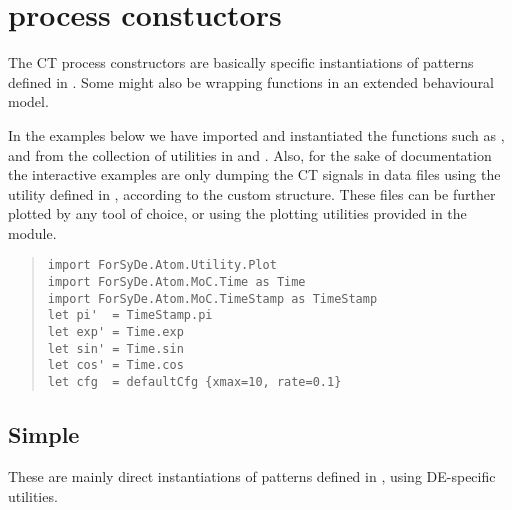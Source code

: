 \section{ process constuctors}
The CT process constructors are basically specific
 instantiations of patterns defined in . Some
 might also be wrapping functions in an extended behavioural
 model.\par
In the examples below we have imported and instantiated the
 functions such as  ,  and  from the
 collection of utilities in  and
 . Also, for the sake of documentation
 the interactive examples are only dumping the CT signals in data
 files using the  utility defined in
 , according to the custom 
 structure. These files can be further plotted by any tool of
 choice, or using the plotting utilities provided in the
  module.\par
\begin{quote}
{\haddockverb\begin{verbatim}
import ForSyDe.Atom.Utility.Plot
import ForSyDe.Atom.MoC.Time as Time
import ForSyDe.Atom.MoC.TimeStamp as TimeStamp
let pi'  = TimeStamp.pi
let exp' = Time.exp
let sin' = Time.sin
let cos' = Time.cos
let cfg  = defaultCfg {xmax=10, rate=0.1}\end{verbatim}}
\end{quote}

\subsection{Simple}
These are mainly direct instantiations of patterns defined in
 , using DE-specific utilities.\par

